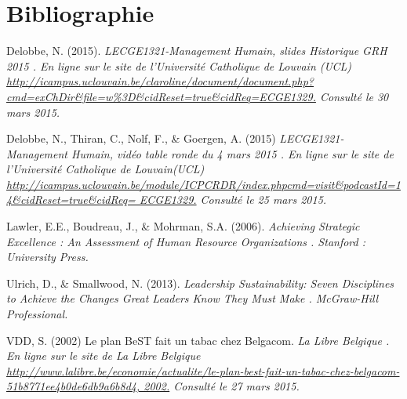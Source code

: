 \pagebreak
\section*{Bibliographie}

Delobbe, N. (2015). \it LECGE1321-Management Humain, slides Historique GRH 2015 \normalfont. En ligne sur le site de l’Université Catholique de Louvain (UCL) \url{http://icampus.uclouvain.be/claroline/document/document.php?cmd=exChDir&file=w\%3D\&cidReset=true\&cidReq=ECGE1329.} Consulté le 30 mars 2015. \newline 

Delobbe, N., Thiran, C., Nolf, F., \& Goergen, A. (2015) \it LECGE1321-Management Humain, vidéo table ronde du 4 mars 2015 \normalfont. En ligne sur le site de l’Université Catholique de Louvain(UCL) \url{http://icampus.uclouvain.be/module/ICPCRDR/index.phpcmd=visit\&podcastId=14\&cidReset=true\&cidReq= ECGE1329.} Consulté le 25 mars 2015. \newline


Lawler, E.E., Boudreau, J., \& Mohrman, S.A. (2006). \it Achieving Strategic Excellence : An Assessment of Human Resource Organizations \normalfont. Stanford : University Press.\newline 

Ulrich, D., \& Smallwood, N. (2013). \it Leadership Sustainability: Seven Disciplines to Achieve the Changes Great Leaders Know They Must Make \normalfont. McGraw-Hill Professional.\newline 

VDD, S. (2002) Le plan BeST fait un tabac chez Belgacom. \it La Libre Belgique \normalfont. En ligne sur le site de La Libre Belgique \url{http://www.lalibre.be/economie/actualite/le-plan-best-fait-un-tabac-chez-belgacom-51b8771ee4b0de6db9a6b8d4, 2002.} Consulté le 27 mars 2015. 
